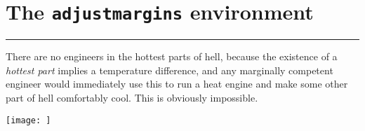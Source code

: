 \documentclass[11pt]{article} %
\makeatletter
\newenvironment{adjustmargins}[2]{%
  \begin{list}{}{%
    \topsep\z@%
    \listparindent\parindent%
    \parsep\parskip%
   \@ifmtarg{#1}{\setlength{\leftmargin}{\z@}}%
   {\setlength{\leftmargin}{#1}}%
   \@ifmtarg{#2}{\setlength{\rightmargin}{\z@}}%
   {\setlength{\rightmargin}{#2}}%
}
\item[]}{\end{list}}
\makeatother
\begin{document}
\section*{The \texttt{adjustmargins} environment}
\lipsum[1]
\begin{adjustmargins}{2in}{-2.7in}
\vfill
\rule{13cm}{.4pt}
There are no engineers in the hottest parts of hell, because the existence of a \textit{hottest part} implies a temperature difference, and any marginally competent engineer would immediately use this to run a heat engine and make some other part of hell comfortably cool.  This is obviously impossible.
\end{adjustmargins}
\medskip
\begin{adjustmargins}{-2.6cm}{-3.2in}

\noindent\texttt{[image: ]}
\end{adjustmargins}
\end{document}
